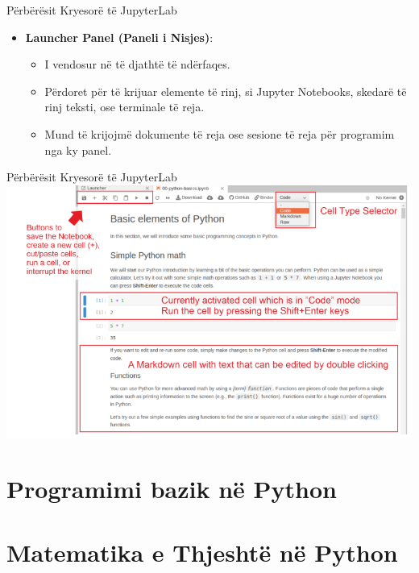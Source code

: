 \documentclass[
  ignorenonframetext,
]{beamer}
\begin{document}
\begin{frame}{Përbërësit Kryesorë të JupyterLab}
\protect\hypertarget{puxebrbuxebruxebsit-kryesoruxeb-tuxeb-jupyterlab-2}{}
\begin{itemize}
\item
  \textbf{Launcher Panel (Paneli i Nisjes)}:

  \begin{itemize}
  \item
    I vendosur në të djathtë të ndërfaqes.
  \item
    Përdoret për të krijuar elemente të rinj, si Jupyter Notebooks,
    skedarë të rinj teksti, ose terminale të reja.
  \item
    Mund të krijojmë dokumente të reja ose sesione të reja për programim
    nga ky panel.
  \end{itemize}
\end{itemize}
\end{frame}

\begin{frame}{Përbërësit Kryesorë të JupyterLab}
\protect\hypertarget{puxebrbuxebruxebsit-kryesoruxeb-tuxeb-jupyterlab-3}{}
\includegraphics{./Figs/jupyter2.png}
\end{frame}

\hypertarget{programimi-bazik-nuxeb-python}{%
\section*{Programimi bazik në
Python}\label{programimi-bazik-nuxeb-python}}

\hypertarget{matematika-e-thjeshtuxeb-nuxeb-python}{%
\section*{Matematika e Thjeshtë në
Python}\label{matematika-e-thjeshtuxeb-nuxeb-python}}
\end{document}
